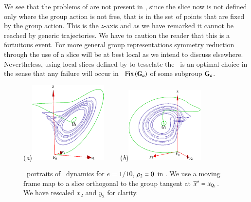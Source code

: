 We see that the problems of
 are not present in , since
the slice now is not defined only where the group action is not free,
that is in the set of points that are fixed by the group action. This
is the $z$-axis and as we have remarked it cannot be reached by generic
trajectories. We have to caution the reader that this is a fortuitous
event. For more general group representations symmetry reduction through
the use of a slice will be at best local as we intend to discuss
elsewhere. Nevertheless, using local slices defined by 
to tesselate the \reducedsp\ is an optimal choice in the sense that any
failure will occur in \fixedsp\ $\mathrm{Fix}\left(\mathbf{G}_a\right)$ of some subgroup
$\mathbf{G}_a$.


\begin{figure}[ht]
\begin{center}
  (\textit{a})\includegraphics[width=0.35\textwidth,clip=true]{../figs/CLEmfReqb1}
~~~~(\textit{b})\includegraphics[width=0.35\textwidth,clip=true]{../figs/CLEmfReqb}
\end{center}
\caption{ \Statesp\
portraits of \cLe\ dynamics for $e=1/10$, $\rho_2=0$
in \reducedsp. We use a moving frame map to a slice orthogonal
to the group tangent at  ${\overline{x}^o}  = x_{\mathrm{Q}_{1}}$. We have rescaled $x_2$ and $y_2$
for clarity.
    }
\label{fig:CLEmfReqb1}
\end{figure}

